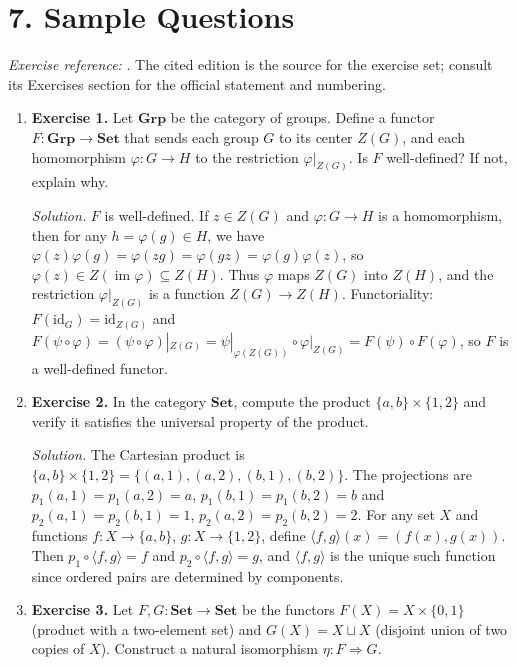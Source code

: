 \section*{7. Sample Questions}
\emph{Exercise reference:} \cite{category_theory_ref1}. The cited edition is the source for the exercise set; consult its Exercises section for the official statement and numbering.
\begin{enumerate}[leftmargin=*,itemsep=0.9em]

\item \textbf{Exercise 1.} Let $\mathbf{Grp}$ be the category of groups. Define a functor $F:\mathbf{Grp}\to\mathbf{Set}$ that sends each group $G$ to its center $Z(G)$, and each homomorphism $\varphi:G\to H$ to the restriction $\varphi|_{Z(G)}$. Is $F$ well-defined? If not, explain why.

\emph{Solution.} $F$ is well-defined. If $z\in Z(G)$ and $\varphi:G\to H$ is a homomorphism, then for any $h=\varphi(g)\in H$, we have $\varphi(z)\varphi(g)=\varphi(zg)=\varphi(gz)=\varphi(g)\varphi(z)$, so $\varphi(z)\in Z(\operatorname{im}\varphi)\subseteq Z(H)$. Thus $\varphi$ maps $Z(G)$ into $Z(H)$, and the restriction $\varphi|_{Z(G)}$ is a function $Z(G)\to Z(H)$. Functoriality: $F(\mathrm{id}_G)=\mathrm{id}_{Z(G)}$ and $F(\psi\circ\varphi)=(\psi\circ\varphi)|_{Z(G)}=\psi|_{\varphi(Z(G))}\circ\varphi|_{Z(G)}=F(\psi)\circ F(\varphi)$, so $F$ is a well-defined functor.

\item \textbf{Exercise 2.} In the category $\mathbf{Set}$, compute the product $\{a,b\}\times\{1,2\}$ and verify it satisfies the universal property of the product.

\emph{Solution.} The Cartesian product is $\{a,b\}\times\{1,2\}=\{(a,1),(a,2),(b,1),(b,2)\}$. The projections are $p_1(a,1)=p_1(a,2)=a$, $p_1(b,1)=p_1(b,2)=b$ and $p_2(a,1)=p_2(b,1)=1$, $p_2(a,2)=p_2(b,2)=2$. For any set $X$ and functions $f:X\to\{a,b\}$, $g:X\to\{1,2\}$, define $\langle f,g\rangle(x)=(f(x),g(x))$. Then $p_1\circ\langle f,g\rangle=f$ and $p_2\circ\langle f,g\rangle=g$, and $\langle f,g\rangle$ is the unique such function since ordered pairs are determined by components.

\item \textbf{Exercise 3.} Let $F,G:\mathbf{Set}\to\mathbf{Set}$ be the functors $F(X)=X\times\{0,1\}$ (product with a two-element set) and $G(X)=X\sqcup X$ (disjoint union of two copies of $X$). Construct a natural isomorphism $\eta:F\Rightarrow G$.


\end{enumerate}
